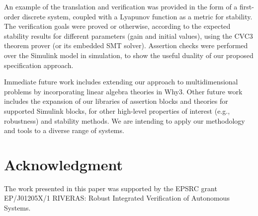 \documentclass[a4paper]{article}
\begin{document}
An example of the translation and verification was provided in the form of a first-order discrete system, coupled with a Lyapunov function as a metric for stability. The verification goals were proved or otherwise, according to the expected stability results for different parameters (gain and initial values), using the CVC3 theorem prover (or its embedded SMT solver). Assertion checks were performed over the Simulink model in simulation, to show the useful duality of our proposed specification approach. 

Immediate future work includes extending our approach to multidimensional problems by incorporating linear algebra theories in Why3. Other future work includes the expansion of our libraries of assertion blocks and theories for supported Simulink blocks, for other high-level properties of interest (e.g., robustness) and stability methods.  We are intending to apply our methodology and tools to a diverse range of systems.

\section*{Acknowledgment}

The work presented in this paper was supported by the EPSRC grant EP/J01205X/1 RIVERAS: Robust Integrated Verification of Autonomous Systems. 





\end{document}
